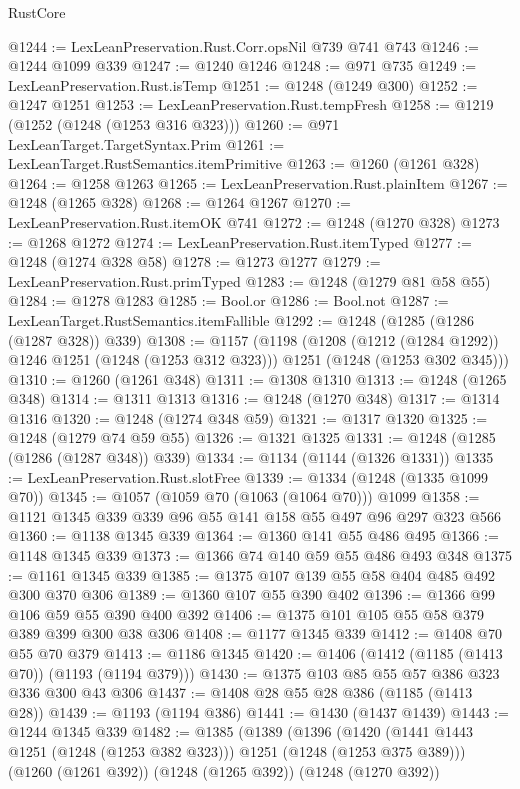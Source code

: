 \begin{lexlean}{RustCore}
\begin{coremodule}
@1244 := LexLeanPreservation.Rust.Corr.opsNil @739 @741 @743
@1246 := @1244 @1099 @339
@1247 := @1240 @1246
@1248 := @971 @735
@1249 := LexLeanPreservation.Rust.isTemp
@1251 := @1248 (@1249 @300)
@1252 := @1247 @1251
@1253 := LexLeanPreservation.Rust.tempFresh
@1258 := @1219 (@1252 (@1248 (@1253 @316 @323)))
@1260 := @971 LexLeanTarget.TargetSyntax.Prim
@1261 := LexLeanTarget.RustSemantics.itemPrimitive
@1263 := @1260 (@1261 @328)
@1264 := @1258 @1263
@1265 := LexLeanPreservation.Rust.plainItem
@1267 := @1248 (@1265 @328)
@1268 := @1264 @1267
@1270 := LexLeanPreservation.Rust.itemOK @741
@1272 := @1248 (@1270 @328)
@1273 := @1268 @1272
@1274 := LexLeanPreservation.Rust.itemTyped
@1277 := @1248 (@1274 @328 @58)
@1278 := @1273 @1277
@1279 := LexLeanPreservation.Rust.primTyped
@1283 := @1248 (@1279 @81 @58 @55)
@1284 := @1278 @1283
@1285 := Bool.or
@1286 := Bool.not
@1287 := LexLeanTarget.RustSemantics.itemFallible
@1292 := @1248 (@1285 (@1286 (@1287 @328)) @339)
@1308 := @1157
    (@1198
      (@1208 (@1212 (@1284 @1292)) @1246 @1251 (@1248 (@1253 @312 @323)))
      @1251
      (@1248 (@1253 @302 @345)))
@1310 := @1260 (@1261 @348)
@1311 := @1308 @1310
@1313 := @1248 (@1265 @348)
@1314 := @1311 @1313
@1316 := @1248 (@1270 @348)
@1317 := @1314 @1316
@1320 := @1248 (@1274 @348 @59)
@1321 := @1317 @1320
@1325 := @1248 (@1279 @74 @59 @55)
@1326 := @1321 @1325
@1331 := @1248 (@1285 (@1286 (@1287 @348)) @339)
@1334 := @1134 (@1144 (@1326 @1331))
@1335 := LexLeanPreservation.Rust.slotFree
@1339 := @1334 (@1248 (@1335 @1099 @70))
@1345 := @1057 (@1059 @70 (@1063 (@1064 @70))) @1099
@1358 := @1121 @1345 @339 @339 @96 @55 @141 @158 @55 @497 @96 @297 @323 @566
@1360 := @1138 @1345 @339
@1364 := @1360 @141 @55 @486 @495
@1366 := @1148 @1345 @339
@1373 := @1366 @74 @140 @59 @55 @486 @493 @348
@1375 := @1161 @1345 @339
@1385 := @1375 @107 @139 @55 @58 @404 @485 @492 @300 @370 @306
@1389 := @1360 @107 @55 @390 @402
@1396 := @1366 @99 @106 @59 @55 @390 @400 @392
@1406 := @1375 @101 @105 @55 @58 @379 @389 @399 @300 @38 @306
@1408 := @1177 @1345 @339
@1412 := @1408 @70 @55 @70 @379
@1413 := @1186 @1345
@1420 := @1406 (@1412 (@1185 (@1413 @70)) (@1193 (@1194 @379)))
@1430 := @1375 @103 @85 @55 @57 @386 @323 @336 @300 @43 @306
@1437 := @1408 @28 @55 @28 @386 (@1185 (@1413 @28))
@1439 := @1193 (@1194 @386)
@1441 := @1430 (@1437 @1439)
@1443 := @1244 @1345 @339
@1482 := @1385
    (@1389
      (@1396
        (@1420 (@1441 @1443 @1251 (@1248 (@1253 @382 @323))) @1251 (@1248 (@1253 @375 @389)))
        (@1260 (@1261 @392))
        (@1248 (@1265 @392))
        (@1248 (@1270 @392))

\end{coremodule}
\end{lexlean}
